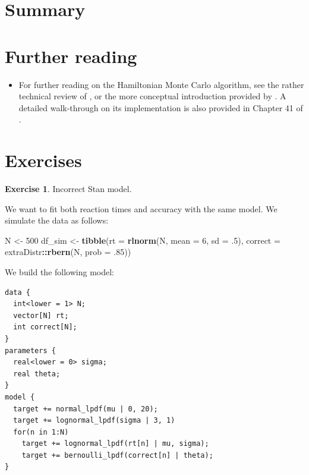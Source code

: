 \documentclass[12pt,]{krantz}
\newenvironment{Shaded}{\begin{snugshade}}{\end{snugshade}}
\newcommand{\KeywordTok}[1]{\textcolor[rgb]{0.13,0.29,0.53}{\textbf{#1}}}
\newcommand{\DataTypeTok}[1]{\textcolor[rgb]{0.13,0.29,0.53}{#1}}
\newcommand{\DecValTok}[1]{\textcolor[rgb]{0.00,0.00,0.81}{#1}}
\newcommand{\FloatTok}[1]{\textcolor[rgb]{0.00,0.00,0.81}{#1}}
\newcommand{\StringTok}[1]{\textcolor[rgb]{0.31,0.60,0.02}{#1}}
\newcommand{\OperatorTok}[1]{\textcolor[rgb]{0.81,0.36,0.00}{\textbf{#1}}}
\newcommand{\NormalTok}[1]{#1}
\providecommand{\tightlist}{%
  \setlength{\itemsep}{0pt}\setlength{\parskip}{0pt}}
\theoremstyle{definition}
\theoremstyle{definition}
\theoremstyle{definition}
\newtheorem{exercise}{Exercise}[chapter]
\theoremstyle{remark}
\begin{document}
\section{Summary}\label{summary-6}

\section{Further reading}\label{further-reading-8}

\begin{itemize}
\tightlist
\item
  For further reading on the Hamiltonian Monte Carlo algorithm, see the
  rather technical review of \citet{betancourt2017conceptual}, or the
  more conceptual introduction provided by
  \citet{monnahanFasterEstimationBayesian2017}. A detailed walk-through
  on its implementation is also provided in Chapter 41 of
  \citet{mackay2003information}.
\end{itemize}

\section{Exercises}\label{exercises-7}

\begin{exercise}
\protect\hypertarget{exr:badstan}{}{\label{exr:badstan} }Incorrect Stan
model. \end{exercise}

We want to fit both reaction times and accuracy with the same model. We
simulate the data as follows:

\begin{Shaded}
\begin{Highlighting}[]
\NormalTok{N <-}\StringTok{ }\DecValTok{500}
\NormalTok{df_sim <-}\StringTok{ }\KeywordTok{tibble}\NormalTok{(}\DataTypeTok{rt =} \KeywordTok{rlnorm}\NormalTok{(N, }\DataTypeTok{mean =} \DecValTok{6}\NormalTok{, }\DataTypeTok{sd =} \FloatTok{.5}\NormalTok{),}
                 \DataTypeTok{correct =}\NormalTok{ extraDistr}\OperatorTok{::}\KeywordTok{rbern}\NormalTok{(N, }\DataTypeTok{prob =} \FloatTok{.85}\NormalTok{))}
\end{Highlighting}
\end{Shaded}

We build the following model:

\begin{verbatim}
data {
  int<lower = 1> N;
  vector[N] rt;
  int correct[N];
}
parameters {
  real<lower = 0> sigma;
  real theta;
}
model {
  target += normal_lpdf(mu | 0, 20);
  target += lognormal_lpdf(sigma | 3, 1)
  for(n in 1:N)
    target += lognormal_lpdf(rt[n] | mu, sigma);
    target += bernoulli_lpdf(correct[n] | theta);
}
\end{verbatim}
\end{document}
